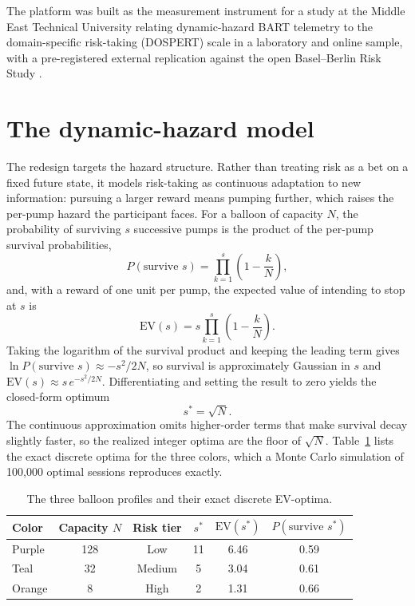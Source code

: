 \documentclass[11pt]{article}
\begin{document}
The platform was built as the measurement instrument for a study at the Middle
East Technical University relating dynamic-hazard BART telemetry to the
domain-specific risk-taking (DOSPERT) scale \citep{weber2002,blais2006} in a
laboratory and online sample, with a pre-registered external replication against
the open Basel--Berlin Risk Study \citep{frey2017}.

\section{The dynamic-hazard model}

The redesign targets the hazard structure. Rather than treating risk as a bet on
a fixed future state, it models risk-taking as continuous adaptation to new
information: pursuing a larger reward means pumping further, which raises the
per-pump hazard the participant faces. For a balloon of capacity $N$, the
probability of surviving $s$ successive pumps is the product of the per-pump
survival probabilities,
%
\begin{equation}
P(\text{survive } s) = \prod_{k=1}^{s}\left(1 - \frac{k}{N}\right),
\end{equation}
%
and, with a reward of one unit per pump, the expected value of intending to stop
at $s$ is
%
\begin{equation}
\mathrm{EV}(s) = s \prod_{k=1}^{s}\left(1 - \frac{k}{N}\right).
\end{equation}
%
Taking the logarithm of the survival product and keeping the leading term gives
$\ln P(\text{survive } s) \approx -s^2/2N$, so survival is approximately Gaussian
in $s$ and $\mathrm{EV}(s) \approx s\,e^{-s^2/2N}$. Differentiating and setting the
result to zero yields the closed-form optimum
%
\begin{equation}
s^* = \sqrt{N}.
\end{equation}
%
The continuous approximation omits higher-order terms that make survival decay
slightly faster, so the realized integer optima are the floor of $\sqrt{N}$.
Table~\ref{tab:optima} lists the exact discrete optima for the three colors, which
a Monte Carlo simulation of 100{,}000 optimal sessions reproduces exactly.

\begin{table}[t]
\centering
\caption{The three balloon profiles and their exact discrete EV-optima.}
\label{tab:optima}
\begin{tabular}{lccccc}
\toprule
Color & Capacity $N$ & Risk tier & $s^*$ & $\mathrm{EV}(s^*)$ & $P(\text{survive } s^*)$\\
\midrule
Purple & 128 & Low    & 11 & 6.46 & 0.59\\
Teal   & 32  & Medium & 5  & 3.04 & 0.61\\
Orange & 8   & High   & 2  & 1.31 & 0.66\\
\bottomrule
\end{tabular}
\end{table}
\end{document}
